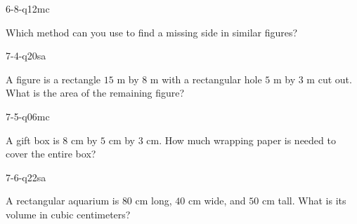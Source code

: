 \begin{practiceQuestion}{6-8-q12}{mc}
\begin{questionText}
Which method can you use to find a missing side in similar figures?
\end{questionText}
\end{practiceQuestion}

\begin{practiceQuestion}{7-4-q20}{sa}
\begin{questionText}
A figure is a rectangle $15$ m by $8$ m with a rectangular hole $5$ m by $3$ m cut out. What is the area of the remaining figure?
\end{questionText}
\end{practiceQuestion}

\begin{practiceQuestion}{7-5-q06}{mc}
\begin{questionText}
A gift box is $8$ cm by $5$ cm by $3$ cm. How much wrapping paper is needed to cover the entire box?
\end{questionText}
\end{practiceQuestion}

\begin{practiceQuestion}{7-6-q22}{sa}
\begin{questionText}
A rectangular aquarium is $80$ cm long, $40$ cm wide, and $50$ cm tall. What is its volume in cubic centimeters?
\end{questionText}
\end{practiceQuestion}


